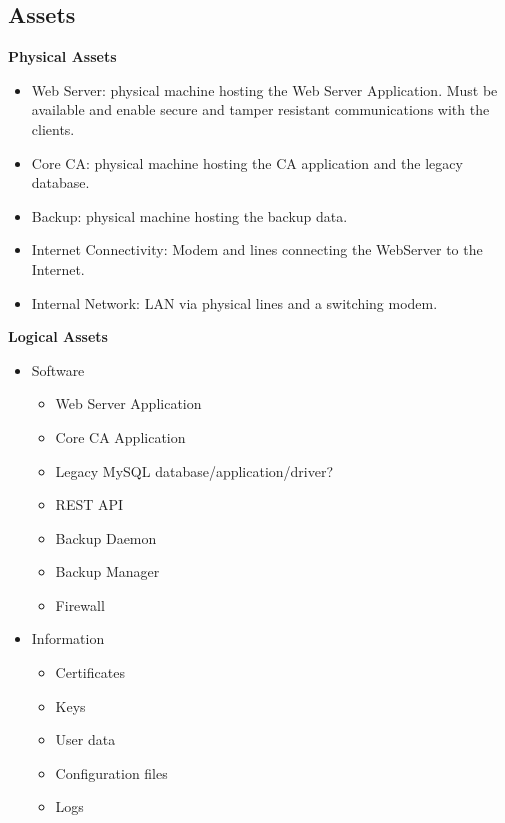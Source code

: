 \documentclass[english]{article}
\begin{document}
\subsection{Assets}


\textbf{Physical Assets}
\begin{itemize}
\item Web Server: physical machine hosting the Web Server Application. Must be available and enable secure and tamper resistant communications with the clients.
\item Core CA: physical machine hosting the CA application and the legacy database.
\item Backup: physical machine hosting the backup data.
\item Internet Connectivity: Modem and lines connecting the WebServer to the Internet.
\item Internal Network: LAN via physical lines and a switching modem.
\end{itemize}

\noindent\textbf{Logical Assets}
\begin{itemize}
    \item Software
    \begin{itemize}
    \item Web Server Application
        \item Core CA Application
        \item Legacy MySQL database/application/driver?
        \item REST API
        \item Backup Daemon
        \item Backup Manager
        \item Firewall
    \end{itemize}
    \item Information
    \begin{itemize}
        \item Certificates
        \item Keys
        \item User data
        \item Configuration files
        \item Logs
    \end{itemize}
\end{itemize}
\end{document}
